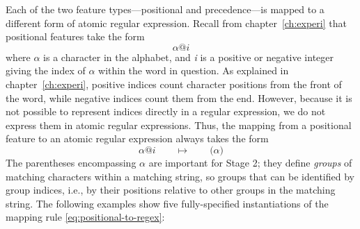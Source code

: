 Each of the two feature types---positional and precedence---is mapped to a different form of
atomic regular expression. Recall from chapter~\ref{ch:experi} that positional features take 
the form
\begin{equation*}
\alpha\text{@}i
\end{equation*}
where $\alpha$ is a character in the alphabet, and \textit{i} is a positive or negative integer 
giving the index of $\alpha$ within the word in question. As explained in chapter~\ref{ch:experi}, 
positive indices count character positions from the front of the word, while negative indices 
count them from the end. However, because it is not possible to represent indices directly in a regular
expression, we do not express them in atomic regular 
expressions. %
Thus, the mapping from a positional feature to an atomic regular expression always takes the form
\begin{equation} \label{eq:positional-to-regex}
\alpha\text{@}i \qquad \mapsto \qquad \texttt{(}\alpha\texttt{)}
\end{equation}
The parentheses encompassing $\alpha$ are important for Stage 2; they define 
\emph{groups} of matching characters within a matching
string, so groups that can be identified by group indices, i.e., by their positions relative to other groups
in the matching string.
The following examples show five fully-specified instantiations of the mapping rule \eqref{eq:positional-to-regex}:
